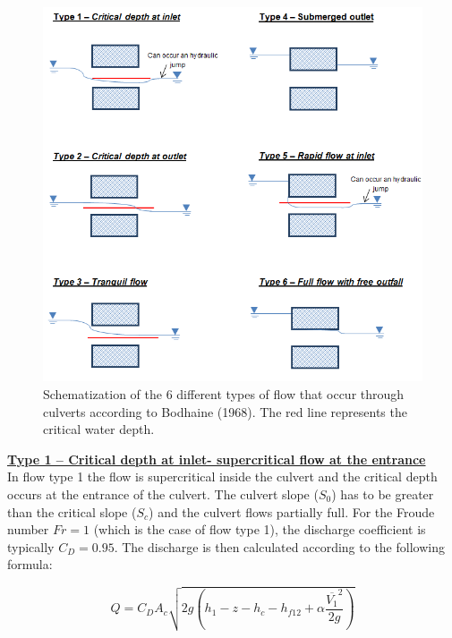 \begin{figure}[H]
\begin{center}
  \includegraphics[scale=0.5]{culvert_fig3.png}
\end{center}
\caption{Schematization of the 6 different types of flow that occur 
through culverts according to Bodhaine (1968). 
The red line represents the critical water depth.}
\label{fig:culvert_fig3}
\end{figure}

\underline{\textbf{Type 1 -- Critical depth at inlet- supercritical flow at the entrance}}\\

In flow type 1 the flow is supercritical inside the culvert and the critical depth occurs 
at the entrance of the culvert. The culvert slope ($S_0$) has to be greater than the 
critical slope ($S_c$) and the culvert flows partially full. 
For the Froude number $Fr=1$ (which is the case of flow type 1), 
the discharge coefficient is typically $C_D=0.95$. 
The discharge is then calculated according to the following formula:

\begin{equation}
Q = C_D A_c \sqrt{2g\left(h_1-z-h_c-h_{f12}+\alpha \dfrac{\overline{V_1}^2}{2g}\right)}
\end{equation}
 

